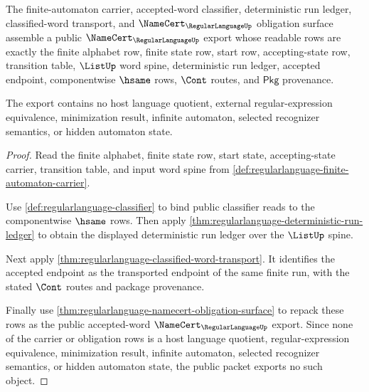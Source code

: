 \begin{theorem}
\label{thm:regularlanguage-public-accepted-word-export}
The finite-automaton carrier, accepted-word classifier, deterministic run
ledger, classified-word transport, and $\NameCert_{\RegularLanguageUp}$
obligation surface assemble a public $\NameCert_{\RegularLanguageUp}$ export
whose readable rows are exactly the finite alphabet row, finite state row,
start row, accepting-state row, transition table, $\ListUp$ word spine,
deterministic run ledger, accepted endpoint, componentwise $\hsame$ rows,
$\Cont$ routes, and $\mathsf{Pkg}$ provenance.

The export contains no host language quotient, external regular-expression
equivalence, minimization result, infinite automaton, selected recognizer
semantics, or hidden automaton state.
\end{theorem}
\begin{proof}
Read the finite alphabet, finite state row, start state, accepting-state
carrier, transition table, and input word spine from
\autoref{def:regularlanguage-finite-automaton-carrier}.

Use \autoref{def:regularlanguage-classifier} to bind public classifier reads to
the componentwise $\hsame$ rows. Then apply
\autoref{thm:regularlanguage-deterministic-run-ledger} to obtain the displayed
deterministic run ledger over the $\ListUp$ spine.

Next apply \autoref{thm:regularlanguage-classified-word-transport}. It
identifies the accepted endpoint as the transported endpoint of the same finite
run, with the stated $\Cont$ routes and package provenance.

Finally use \autoref{thm:regularlanguage-namecert-obligation-surface} to repack
these rows as the public accepted-word $\NameCert_{\RegularLanguageUp}$ export.
Since none of the carrier or obligation rows is a host language quotient,
regular-expression equivalence, minimization result, infinite automaton,
selected recognizer semantics, or hidden automaton state, the public packet
exports no such object.
\end{proof}

